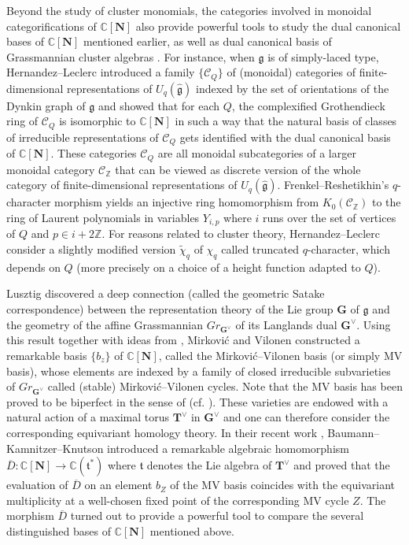 \documentclass[12pt]{amsart}
\theoremstyle{plain}
\theoremstyle{definition}
\numberwithin{equation}{section}
\newcommand{\tchi}{{\widetilde{\chi}}}
\newcommand{\barD}{\overline{D}}
\newcommand{\CN}{\mathbb{C}[\mathbf{N}]}
\newcommand{\CQ}{\mathcal{C}_Q}
\newcommand{\CZ}{\mathcal{C}_{\mathbb{Z}}}
\begin{document}
   Beyond the study of cluster monomials, the categories involved in monoidal categorifications of $\CN$ also provide powerful tools to study the dual canonical bases of $\CN$ \cite{Li24} mentioned earlier, as well as dual canonical basis of Grassmannian cluster algebras \cite{CDFL}. For instance, when $\mathfrak{g}$ is of simply-laced type, Hernandez--Leclerc \cite{HL15} introduced a family $\{ \CQ \}$ of (monoidal) categories  of finite-dimensional representations of $U_q(\widehat{\mathfrak{g}})$ indexed by the set of orientations of the Dynkin graph of $\mathfrak{g}$ and showed that for each $Q$, the  complexified Grothendieck ring of $\CQ$ is isomorphic to $\CN$ in such a way that  the natural basis of classes of irreducible representations of $\CQ$ gets identified with the dual canonical basis of $\CN$. These categories $\CQ$ are all monoidal subcategories of a larger  monoidal category $\CZ$ that can be viewed as discrete version of the whole category of finite-dimensional representations of $U_q(\widehat{\mathfrak{g}})$. Frenkel--Reshetikhin's $q$-character morphism \cite[Theorem 3]{FR99} yields an injective ring homomorphism from $K_0(\CZ)$ to the ring of Laurent polynomials in variables $Y_{i,p}$ where $i$ runs over the set of vertices of $Q$ and $p \in i + 2 \mathbb{Z}$. For reasons related to cluster theory, Hernandez--Leclerc consider a slightly modified version $\tchi_q$ of $\chi_q$ called truncated $q$-character, which depends on $Q$ (more precisely on a choice of a height function adapted to $Q$). 

   
 Lusztig \cite{lusztig1983singularities} discovered a deep connection (called the geometric  Satake correspondence) between the representation theory of the Lie group $\mathbf{G}$ of \(\mathfrak{g}\) and the geometry of the affine Grassmannian $Gr_{\mathbf{G}^{\vee}}$ of its Langlands dual $\mathbf{G}^{\vee}$. Using this result together with ideas from \cite{ginzburg1995perverse}, Mirkovi\'c and Vilonen \cite{MV00, mirkovic2007geometric} constructed a remarkable basis $\{ b_z \}$ of $\CN$, called the Mirkovi\'c--Vilonen basis (or simply MV basis), whose elements are  indexed by a family of closed irreducible subvarieties of $Gr_{\mathbf{G}^{\vee}}$ called (stable) Mirkovi\'c--Vilonen cycles. Note that the MV basis has been proved to be biperfect in the sense of \cite{BKK21} (cf. \cite[Theorem 5.2]{BKK21}). These varieties are endowed with a natural action of a maximal torus $\mathbf{T}^{\vee}$ in $\mathbf{G}^{\vee}$ and one can therefore consider the corresponding equivariant homology theory. In their recent work \cite{BKK21}, Baumann--Kamnitzer--Knutson introduced a remarkable algebraic homomorphism $\barD : \CN \longrightarrow \mathbb{C}(\mathfrak{t}^{*})$  where $\mathfrak{t}$ denotes the Lie algebra of $\mathbf{T}^{\vee}$ and proved that the evaluation of $\barD$ on an element $b_Z$ of the MV basis coincides with the equivariant multiplicity at a well-chosen fixed point of the corresponding MV cycle $Z$. The morphism $\barD$ turned out to provide a powerful tool to compare the several distinguished bases of $\CN$ mentioned above. 
   
\end{document}
